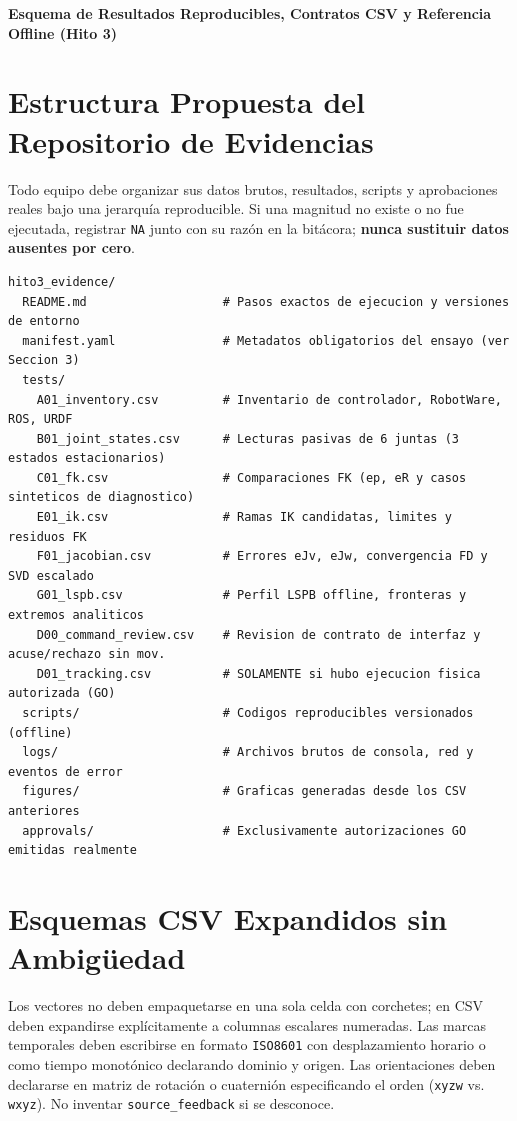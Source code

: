 \documentclass[10.5pt, a4paper]{article}
\begin{document}
\begin{center}
    \Large\textbf{\textcolor{ucbblue}{Esquema de Resultados Reproducibles, Contratos CSV y Referencia Offline (Hito 3)}}
\end{center}

\section{Estructura Propuesta del Repositorio de Evidencias}
Todo equipo debe organizar sus datos brutos, resultados, scripts y aprobaciones reales bajo una jerarquía reproducible. Si una magnitud no existe o no fue ejecutada, registrar \texttt{NA} junto con su razón en la bitácora; \textbf{nunca sustituir datos ausentes por cero}.

\begin{lstlisting}
hito3_evidence/
  README.md                   # Pasos exactos de ejecucion y versiones de entorno
  manifest.yaml               # Metadatos obligatorios del ensayo (ver Seccion 3)
  tests/
    A01_inventory.csv         # Inventario de controlador, RobotWare, ROS, URDF
    B01_joint_states.csv      # Lecturas pasivas de 6 juntas (3 estados estacionarios)
    C01_fk.csv                # Comparaciones FK (ep, eR y casos sinteticos de diagnostico)
    E01_ik.csv                # Ramas IK candidatas, limites y residuos FK
    F01_jacobian.csv          # Errores eJv, eJw, convergencia FD y SVD escalado
    G01_lspb.csv              # Perfil LSPB offline, fronteras y extremos analiticos
    D00_command_review.csv    # Revision de contrato de interfaz y acuse/rechazo sin mov.
    D01_tracking.csv          # SOLAMENTE si hubo ejecucion fisica autorizada (GO)
  scripts/                    # Codigos reproducibles versionados (offline)
  logs/                       # Archivos brutos de consola, red y eventos de error
  figures/                    # Graficas generadas desde los CSV anteriores
  approvals/                  # Exclusivamente autorizaciones GO emitidas realmente
\end{lstlisting}

\section{Esquemas CSV Expandidos sin Ambigüedad}
Los vectores no deben empaquetarse en una sola celda con corchetes; en CSV deben expandirse explícitamente a columnas escalares numeradas. Las marcas temporales deben escribirse en formato \texttt{ISO8601} con desplazamiento horario o como tiempo monotónico declarando dominio y origen. Las orientaciones deben declararse en matriz de rotación o cuaternión especificando el orden (\texttt{xyzw} vs. \texttt{wxyz}). No inventar \texttt{source\_feedback} si se desconoce.
\end{document}
